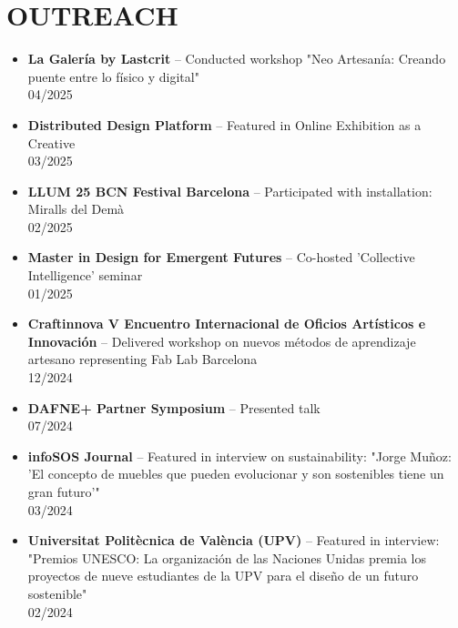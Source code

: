 \documentclass[11pt,a4paper]{article}
\begin{document}
\section*{OUTREACH}
\begin{itemize}[leftmargin=*,label={},itemsep=2pt]
    \item \textbf{La Galería by Lastcrit} -- Conducted workshop "Neo Artesanía: Creando puente entre lo físico y digital"\\
    04/2025

    \item \textbf{Distributed Design Platform} -- Featured in Online Exhibition as a Creative\\
    03/2025
    
    \item \textbf{LLUM 25 BCN Festival Barcelona} -- Participated with installation: Miralls del Dem\`a\\
    02/2025
    
    \item \textbf{Master in Design for Emergent Futures} -- Co-hosted 'Collective Intelligence' seminar\\
    01/2025
    
    \item \textbf{Craftinnova V Encuentro Internacional de Oficios Artísticos e Innovación} -- Delivered workshop on nuevos m\'etodos de aprendizaje artesano representing Fab Lab Barcelona\\
    12/2024
    
    \item \textbf{DAFNE+ Partner Symposium} -- Presented talk\\
    07/2024
    
    \item \textbf{infoSOS Journal} -- Featured in interview on sustainability: "Jorge Mu\~noz: 'El concepto de muebles que pueden evolucionar y son sostenibles tiene un gran futuro'"\\
    03/2024
    
    \item \textbf{Universitat Polit\`ecnica de Val\`encia (UPV)} -- Featured in interview: "Premios UNESCO: La organizaci\'on de las Naciones Unidas premia los proyectos de nueve estudiantes de la UPV para el dise\~no de un futuro sostenible"\\
    02/2024
    
\end{itemize}

\end{document}
